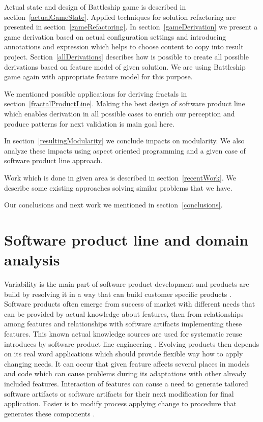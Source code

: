 \documentclass[11pt,english,a4paper,twoside]{article}
\begin{document}
Actual state and design of Battleship game is described in section~\ref{actualGameState}. Applied techniques for solution refactoring are presented in section~\ref{gameRefactoring}. In section~\ref{gameDerivation} we present a game derivation based on actual configuration settings and introducing annotations and expression which helps to choose content to copy into result project. 
Section~\ref{allDerivations} describes how is possible to create all possible derivations based on feature model of given solution. We are using Battleship game again with appropriate feature model for this purpose. 

We mentioned possible applications for deriving fractals in section~\ref{fractalProductLine}. Making the best design of software product line which enables derivation in all possible cases to enrich our perception and produce patterns for next validation is main goal here.  

In section~\ref{resultingModularity} we conclude impacts on modularity. We also analyze these impacts using aspect oriented programming and a given case of software product line approach.

Work which is done in given area is described in section~\ref{recentWork}. We describe some existing approaches solving similar problems that we have.

Our conclusions and next work we mentioned in section~\ref{conclusions}.


\section{Software product line and domain analysis} \label{domainAnalysis}

Variability is the main part of software product development and products are build by resolving it in a way that can build customer specific products \cite{botterweck_automating_2009}. Software products often emerge from success of market with different needs that can be provided by actual knowledge about features, then from relationships among features and relationships with software artifacts implementing these features. This known actual knowledge sources are used for systematic reuse introduces by software product line engineering \cite{reinhartz-berger_domain_2013}. Evolving products then depends on its real word applications which should provide flexible way how to apply changing needs. It can occur that given feature affects several places in models and code which can cause problems during its adaptations with other already included features. Interaction of features can cause a need to generate tailored software artifacts or software artifacts for their next modification for final application. Easier is to modify process applying change to procedure that generates these components \cite{vranic_features_2016}. 
\end{document}
